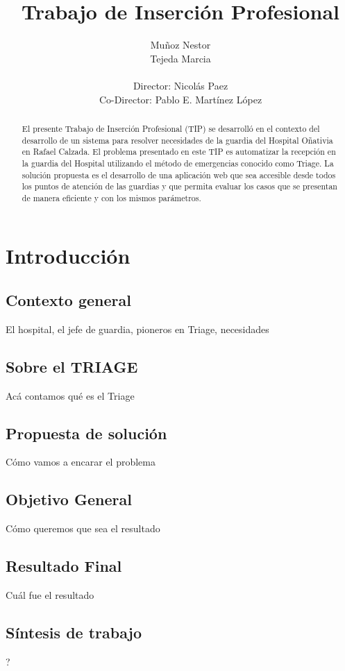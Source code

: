 \documentclass[a4paper,10pt]{article}
\title{Trabajo de Inserción Profesional}
\author{Muñoz Nestor \\ Tejeda Marcia \\ \\ Director: Nicolás Paez \\  Co-Director: Pablo E. Martínez López}
\begin{document}
\maketitle
\newpage 
\begin{abstract}
El presente Trabajo de Inserción Profesional (TIP) se desarrolló en el contexto del desarrollo de un sistema para resolver necesidades de la guardia del Hospital Oñativia en Rafael Calzada.
\linebreak 
El problema presentado en este TIP es automatizar la recepción en la guardia del Hospital utilizando el método de emergencias conocido como Triage. 
\linebreak 
La solución propuesta es el desarrollo de una aplicación web que sea accesible desde todos los puntos de atención de las guardias y que permita evaluar los casos que se presentan de manera eficiente y con los mismos parámetros.

\end{abstract}


\newpage 
\tableofcontents


\newpage 
\section{Introducción}
\subsection{Contexto general}
El hospital, el jefe de guardia, pioneros en Triage, necesidades
\subsection{Sobre el TRIAGE}
Acá contamos qué es el Triage
\subsection{Propuesta de solución}
Cómo vamos a encarar el problema
\subsection{Objetivo General}
Cómo queremos que sea el resultado
\subsection{Resultado Final}
Cuál fue el resultado
\subsection{Síntesis de trabajo}
?
\end{document}
